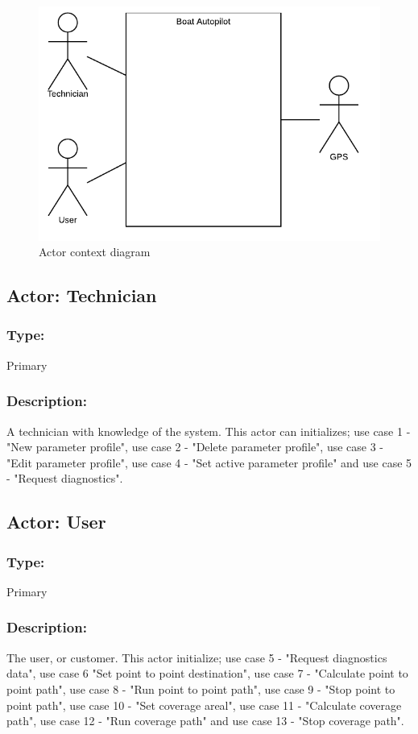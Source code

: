 \begin{figure}[H]
	\centering
	\includegraphics{Images/Requirements_specification/Actor_context_diagram}
	\caption{Actor context diagram}
	\label{fig:actor}
\end{figure}

\subsection{Actor: Technician}
\subsubsection*{Type:}
Primary

\subsubsection*{Description:}
A technician with knowledge of the system. This actor can initializes; use case 1 - "New parameter profile", use case 2 - "Delete parameter profile", use case 3 - "Edit parameter profile", use case 4 - "Set active parameter profile" and use case 5 - "Request diagnostics".


\subsection{Actor: User}
\subsubsection*{Type:}
Primary

\subsubsection*{Description:}
The user, or customer. This actor initialize; use case 5 - "Request diagnostics data", use case 6 "Set point to point destination", use case 7 - "Calculate point to point path", use case 8 - "Run point to point path", use case 9 - "Stop point to point path", use case 10 - "Set coverage areal", use case 11 - "Calculate coverage path", use case 12 - "Run coverage path" and use case 13 - "Stop coverage path".

